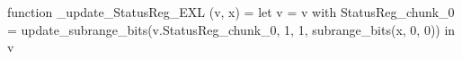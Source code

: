 function _update_StatusReg_EXL (v, x) = let v = { v with StatusReg_chunk_0 = update_subrange_bits(v.StatusReg_chunk_0, 1, 1, subrange_bits(x, 0, 0)) } in
  v
